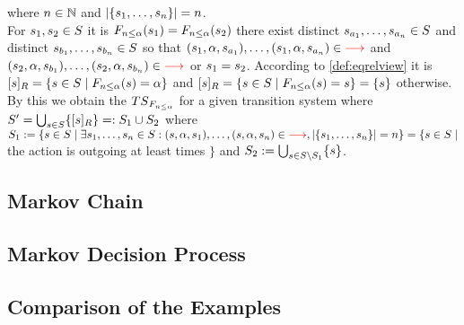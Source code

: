 \documentclass[preview]{standalone}
\begin{document}
where ${n} \in {\mathbb{N}}$ and $|\{{s}_1, \dots, {s}_{n}\}| = n$. \\
For ${s}_1,{s}_2 \in {S}$ it is ${{{{F}}_{{n}\leq\alpha}}}({s}_1) = {{{{F}}_{{n}\leq\alpha}}}({s}_2)$ \iffN there exist distinct ${s}_{a_1}, \dots, {s}_{a_{n}} \in {S}$ and distinct ${s}_{b_1}, \dots, {s}_{b_{n}} \in {S}$ so that $({s}_1, {\alpha}, {s}_{a_1}), \dots, ({s}_1, {\alpha}, {s}_{a_{n}}) \in {\color{red}\ensuremath{{\longrightarrow}}}$ and $({s}_2, {\alpha}, {s}_{b_1}), \dots, ({s}_2, {\alpha}, {s}_{b_{n}}) \in {\color{red}\ensuremath{{\longrightarrow}}}$ or ${s}_1 = {s}_2$. According to \ref{def:eqrelview} it is $\eqclassv{\state} = \{\state \in \states \mid \gfctminoutaction(\state) = \action\}$ and $\eqclassv{\state} = \{\state \in \states \mid \gfctminoutaction(\state) = \state\} = \{\state\}$ otherwise. \\
By this we obtain the \viewN ${{{TS}_{{{{F}}_{{n}\leq\alpha}}}}}$ for a given transition system \ts where ${S}' = \bigcup_{{s} \in {S}} \{{{[{s}]_{{R}}}}\} =: {S}_1 \cup {S}_2$ where ${S}_1 := \{{s} \in {S} \mid \exists {s}_1, \dots, {s}_{n} \in {S}: ({s}, {\alpha}, {s}_1), \dots, ({s}, {\alpha}, {s}_{n}) \in {\color{red}\ensuremath{{\longrightarrow}}}, |\{{s}_1, \dots, {s}_{n}\}| = n\} = \{{s} \in {S} \mid$ the action \action is outgoing at least \n times $\}$ and ${S}_2 := \bigcup_{{s} \in {S} \setminus {S}_1}\{{s}\}$.



\subsection{Markov Chain}
\subsection{Markov Decision Process}
\subsection{Comparison of the Examples}
\end{document}
